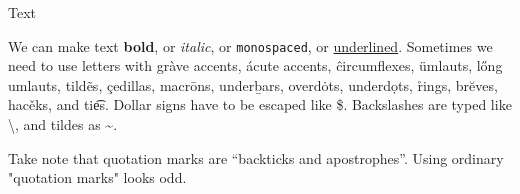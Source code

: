 \documentclass{article}
\begin{document}
\begin{center}
\Large Text
\end{center}

We can make text \textbf{bold}, or \emph{italic}, or \texttt{monospaced}, or \underline{underlined}. Sometimes we need to use letters with gr\`{a}ve accents, \'{a}cute accents, \^{c}ircumflexes, \"{u}mlauts, l\H{o}ng umlauts, tild\~{e}s, \c{c}edillas, macr\={o}ns, under\b{b}ars, overd\.{o}ts, underd\d{o}ts, \r{r}ings, br\u{e}ves, hac\v{e}ks, and ti\t{es}. Dollar signs have to be escaped like \$. Backslashes are typed like \textbackslash, and tildes as \textasciitilde.

Take note that quotation marks are ``backticks and apostrophes''. Using ordinary "quotation marks" looks odd.
\end{document}
